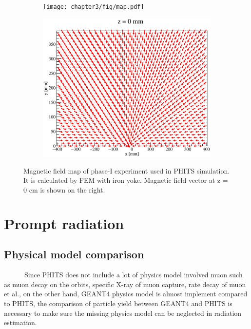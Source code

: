  \begin{figure}[H]
  \begin{subfigure}{0.3\textwidth}
   \centering
   \texttt{[image: chapter3/fig/map.pdf]}
  \end{subfigure}
  \hspace{0.2\textwidth}
  \begin{subfigure}{0.3\textwidth}
   \centering
   \includegraphics[scale=0.35]{chapter3/fig/fieldxy}
  \end{subfigure}
  \caption{Magnetic field map of phase-I experiment used in PHITS simulation. It is calculated by FEM with iron yoke. Magnetic field vector at z = 0 cm is shown on the right.}
  \label{field}
 \end{figure}

 \section{Prompt radiation}
  \subsection{Physical model comparison}
~~~~~~Since PHITS does not include a lot of physics model involved muon such as muon decay on the orbits, specific X-ray of muon capture, rate decay of muon et al., on the other hand, GEANT4 physics model is almost implement compared to PHITS, the comparison of particle yield between GEANT4 and PHITS is necessary to make sure the missing physics model can be neglected in radiation estimation.

